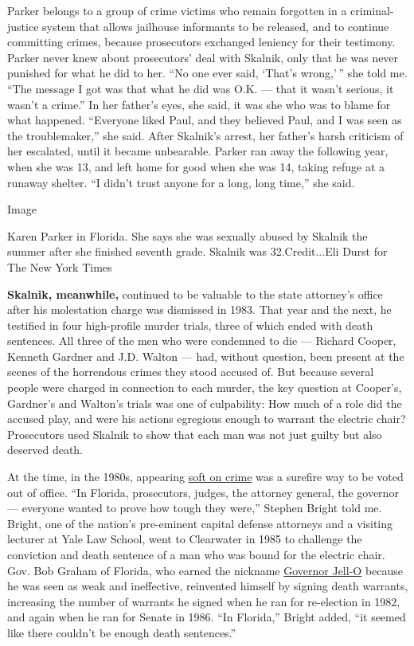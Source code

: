 Parker belongs to a group of crime victims who remain forgotten in a
criminal-justice system that allows jailhouse informants to be released,
and to continue committing crimes, because prosecutors exchanged
leniency for their testimony. Parker never knew about prosecutors' deal
with Skalnik, only that he was never punished for what he did to her.
``No one ever said, `That's wrong,' '' she told me. ``The message I got
was that what he did was O.K. --- that it wasn't serious, it wasn't a
crime.'' In her father's eyes, she said, it was she who was to blame for
what happened. ``Everyone liked Paul, and they believed Paul, and I was
seen as the troublemaker,'' she said. After Skalnik's arrest, her
father's harsh criticism of her escalated, until it became unbearable.
Parker ran away the following year, when she was 13, and left home for
good when she was 14, taking refuge at a runaway shelter. ``I didn't
trust anyone for a long, long time,'' she said.

Image

Karen Parker in Florida. She says she was sexually abused by Skalnik the
summer after she finished seventh grade. Skalnik was 32.Credit...Eli
Durst for The New York Times

\textbf{Skalnik, meanwhile,} continued to be valuable to the state
attorney's office after his molestation charge was dismissed in 1983.
That year and the next, he testified in four high-profile murder trials,
three of which ended with death sentences. All three of the men who were
condemned to die --- Richard Cooper, Kenneth Gardner and J.D. Walton ---
had, without question, been present at the scenes of the horrendous
crimes they stood accused of. But because several people were charged in
connection to each murder, the key question at Cooper's, Gardner's and
Walton's trials was one of culpability: How much of a role did the
accused play, and were his actions egregious enough to warrant the
electric chair? Prosecutors used Skalnik to show that each man was not
just guilty but also deserved death.

At the time, in the 1980s, appearing
\href{https://www.upi.com/Archives/1982/07/04/Early-release-from-prison-a-response-to-overcrowding-Does-it-work/6141394603200/}{soft
on crime} was a surefire way to be voted out of office. ``In Florida,
prosecutors, judges, the attorney general, the governor --- everyone
wanted to prove how tough they were,'' Stephen Bright told me. Bright,
one of the nation's pre-eminent capital defense attorneys and a visiting
lecturer at Yale Law School, went to Clearwater in 1985 to challenge the
conviction and death sentence of a man who was bound for the electric
chair. Gov. Bob Graham of Florida, who earned the nickname
\href{https://www.orlandosentinel.com/news/os-xpm-2003-04-20-0304190009-story.html}{Governor
Jell-O} because he was seen as weak and ineffective, reinvented himself
by signing death warrants, increasing the number of warrants he signed
when he ran for re-election in 1982, and again when he ran for Senate in
1986. ``In Florida,'' Bright added, ``it seemed like there couldn't be
enough death sentences.''

